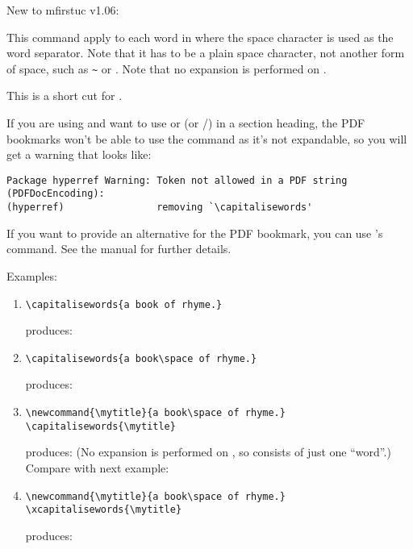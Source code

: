 \documentclass{nlctdoc}
\begin{document}
New to mfirstuc v1.06:
\begin{definition}[\DescribeMacro{\capitalisewords}]
\end{definition}
This command apply  to each word in 
where the space character is used as the word separator. Note that
it has to be a plain space character, not another form of space,
such as \verb|~| or . Note that no expansion is performed
on .

\begin{definition}[\DescribeMacro{\xcapitalisewords}]
\end{definition}
This is a short cut for
.

\begin{important}
If you are using  and want to use 
or  (or \slash{}) 
in a section heading, the PDF bookmarks won't be able to use the command 
as it's not expandable, so you will get a warning that looks like:
\begin{verbatim}
Package hyperref Warning: Token not allowed in a PDF string (PDFDocEncoding):
(hyperref)                removing `\capitalisewords'
\end{verbatim}
If you want to provide an alternative for the PDF bookmark, you can
use 's  command. See the
 manual for further details.
\end{important}

Examples:
\begin{enumerate}
\item 
\begin{verbatim}
\capitalisewords{a book of rhyme.}
\end{verbatim}
produces:

\item
\begin{verbatim}
\capitalisewords{a book\space of rhyme.}
\end{verbatim}
produces:

\item
\begin{verbatim}
\newcommand{\mytitle}{a book\space of rhyme.}
\capitalisewords{\mytitle}
\end{verbatim}
produces:
\newcommand{\mytitle}{a book\space of rhyme.}
\capitalisewords{\mytitle}
(No expansion is performed on , so 
consists of just one ``word''.) Compare with next example:

\item
\begin{verbatim}
\newcommand{\mytitle}{a book\space of rhyme.}
\xcapitalisewords{\mytitle}
\end{verbatim}
produces:
\xcapitalisewords{\mytitle}

\end{enumerate}
\end{document}
